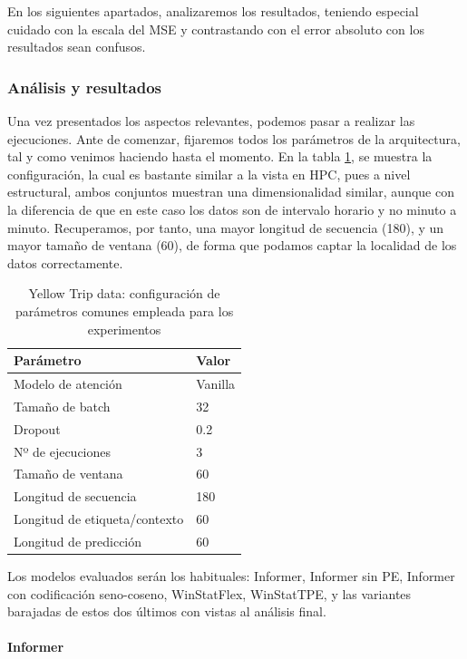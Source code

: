 En los siguientes apartados, analizaremos los resultados, teniendo especial cuidado con la escala del MSE y contrastando con el error absoluto con los resultados sean confusos.

\subsubsection{Análisis y resultados}

Una vez presentados los aspectos relevantes, podemos pasar a realizar las ejecuciones. Ante de comenzar, fijaremos todos los parámetros de la arquitectura, tal y como venimos haciendo hasta el momento. En la tabla \ref{ajustestaxi}, se muestra la configuración, la cual es bastante similar a la vista en HPC, pues a nivel estructural, ambos conjuntos muestran una dimensionalidad similar, aunque con la diferencia de que en este caso los datos son de intervalo horario y no minuto a minuto. Recuperamos, por tanto, una mayor longitud de secuencia (180), y un mayor tamaño de ventana (60), de forma que podamos captar la localidad de los datos correctamente.

\begin{table}[!ht]
	\centering
	\begin{tabular}{l|l}
		\toprule
		Parámetro & Valor \\
		\midrule
		{Modelo de atención} & Vanilla \\
		{Tamaño de batch} & 32 \\
		{Dropout} & 0.2 \\
		{Nº de ejecuciones} & 3 \\
		{Tamaño de ventana} & 60 \\
		{Longitud de secuencia} & 180 \\
		{Longitud de etiqueta/contexto} & 60 \\
		{Longitud de predicción} & 60 \\
		\bottomrule
	\end{tabular}
	\caption{Yellow Trip data: configuración de parámetros comunes empleada para los experimentos}
	\label{ajustestaxi}
\end{table}

Los modelos evaluados serán los habituales: Informer, Informer sin PE, Informer con codificación seno-coseno, WinStatFlex, WinStatTPE, y las variantes barajadas de estos dos últimos con vistas al análisis final.

\paragraph{Informer}

